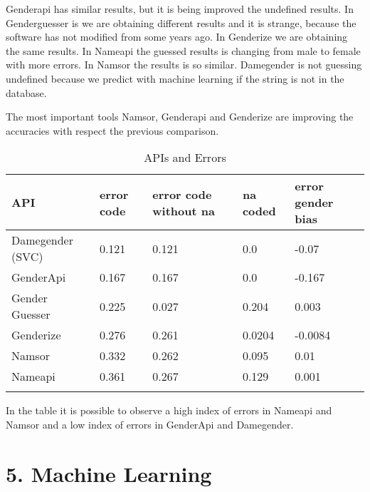 \documentclass[fleqn,10pt]{wlpeerj} %
\begin{document}
Genderapi has similar results, but it is being improved the undefined
results. In Genderguesser is we are obtaining different results and it
is strange, because the software has not modified from some years
ago. In Genderize we are obtaining the same results. In Nameapi the
guessed results is changing from male to female with more errors. In
Namsor the results is so similar. Damegender is not guessing undefined
because we predict with machine learning if the string is not in the
database.

The most important tools Namsor, Genderapi and Genderize are improving the
accuracies with respect the previous comparison.

\begin{longtable}[]{@{}lllll@{}}
\toprule
API & error code & error code without na & na coded & error gender bias\tabularnewline
\midrule
\endhead
Damegender (SVC)\footnotemark[1] & 0.121 & 0.121 & 0.0 & -0.07\tabularnewline
GenderApi & 0.167 & 0.167 & 0.0 & -0.167\tabularnewline
Gender Guesser & 0.225 & 0.027 & 0.204 & 0.003\tabularnewline
Genderize & 0.276 & 0.261 & 0.0204 & -0.0084 \tabularnewline 
Namsor & 0.332 & 0.262 & 0.095 & 0.01 \tabularnewline
Nameapi & 0.361 & 0.267 & 0.129 & 0.001 \tabularnewline
\bottomrule
\caption{APIs and Errors}
\label{table:ApisAndErrors}
\end{longtable}

In the table it is possible to observe a high index of errors in
Nameapi and Namsor and a low index of errors in GenderApi
and Damegender.


\section{5. Machine Learning}

We have developed a script infofeatures.py with our datasets to
analyze data about features. The datasets used in this experiment was
retrieved from official datasets from national statistical
institutions in Spain, Uruguay, United Kingdom, USA. The features used
are: first letter, last letter, a, b, c, d, e, f, g, h, i, j, k, l, m,
n, o, p, q, r, s, t, u, v, w, x, y, z, vocals, consonants, first
letter, first letter vocal, last letter vocal, last letter consonant,
last letter a. The choosing of features was verified with Principal
Component Analysis.
\end{document}

